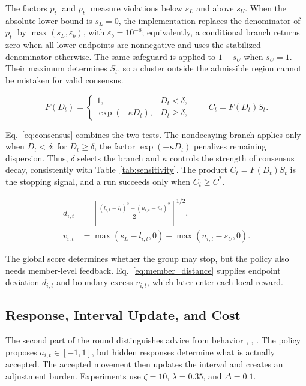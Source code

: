 \documentclass[journal]{IEEEtran}
\newcommand{\eqnote}[1]{\par\vspace{-0.3ex}\noindent #1\par\vspace{0.4ex}}
\begin{document}
\eqnote{The factors $p_t^-$ and $p_t^+$ measure violations below $s_L$ and above $s_U$. When the absolute lower bound is $s_L=0$, the implementation replaces the denominator of $p_t^-$ by $\max(s_L,\varepsilon_b)$, with $\varepsilon_b=10^{-8}$; equivalently, a conditional branch returns zero when all lower endpoints are nonnegative and uses the stabilized denominator otherwise. The same safeguard is applied to $1-s_U$ when $s_U=1$. Their maximum determines $S_t$, so a cluster outside the admissible region cannot be mistaken for valid consensus.}

\begin{equation}
F(D_t)=
\begin{cases}
1, & D_t<\delta,\\
\exp(-\kappa D_t), & D_t\ge\delta,
\end{cases}
\qquad C_t=F(D_t)S_t.
\label{eq:consensus}
\end{equation}

\eqnote{Eq.~\eqref{eq:consensus} combines the two tests. The nondecaying branch applies only when $D_t<\delta$; for $D_t\ge\delta$, the factor $\exp(-\kappa D_t)$ penalizes remaining dispersion. Thus, $\delta$ selects the branch and $\kappa$ controls the strength of consensus decay, consistently with Table~\ref{tab:sensitivity}. The product $C_t=F(D_t)S_t$ is the stopping signal, and a run succeeds only when $C_t\ge C^*$.}

\begin{equation}
\begin{aligned}
d_{i,t}&=\left[\frac{(l_{i,t}-\bar l_t)^2+(u_{i,t}-\bar u_t)^2}{2}\right]^{1/2},\\
v_{i,t}&=\max(s_L-l_{i,t},0)+\max(u_{i,t}-s_U,0).
\end{aligned}
\label{eq:member_distance}
\end{equation}

\eqnote{The global score determines whether the group may stop, but the policy also needs member-level feedback. Eq.~\eqref{eq:member_distance} supplies endpoint deviation $d_{i,t}$ and boundary excess $v_{i,t}$, which later enter each local reward.}

\subsection{Response, Interval Update, and Cost}

The second part of the round distinguishes advice from behavior \cite{ref18}, \cite{ref23}, \cite{ref24}. The policy proposes $a_{i,t}\in[-1,1]$, but hidden responses determine what is actually accepted. The accepted movement then updates the interval and creates an adjustment burden. Experiments use $\zeta=10$, $\lambda=0.35$, and $\Delta=0.1$.
\end{document}
